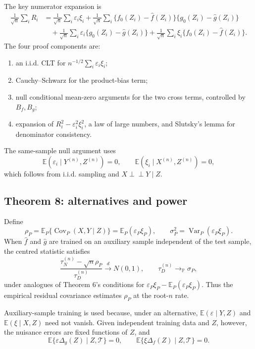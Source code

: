 \documentclass[11pt]{article}
\theoremstyle{definition}
\newcommand{\indep}{\perp\!\!\!\perp}
\newcommand{\E}{\mathbb{E}}
\newcommand{\Var}{\operatorname{Var}}
\newcommand{\Cov}{\operatorname{Cov}}
\newcommand{\calT}{\mathcal{T}}
\begin{document}
The key numerator expansion is
\begin{align}
\frac1{\sqrt n}\sum_iR_i
&=
\frac1{\sqrt n}\sum_i\varepsilon_i\xi_i
+
\frac1{\sqrt n}\sum_i\{f_0(Z_i)-\widehat f(Z_i)\}
\{g_0(Z_i)-\widehat g(Z_i)\} \nonumber\\
&\quad+
\frac1{\sqrt n}\sum_i\varepsilon_i\{g_0(Z_i)-\widehat g(Z_i)\}
+
\frac1{\sqrt n}\sum_i\xi_i\{f_0(Z_i)-\widehat f(Z_i)\}.
\label{eq:original-gcm-decomp}
\end{align}
The four proof components are:
\begin{enumerate}[leftmargin=*]
\item an i.i.d. CLT for $n^{-1/2}\sum_i\varepsilon_i\xi_i$;
\item Cauchy--Schwarz for the product-bias term;
\item null conditional mean-zero arguments for the two cross terms, controlled by $B_f,B_g$;
\item expansion of $R_i^2-\varepsilon_i^2\xi_i^2$, a law of large numbers, and Slutsky's
lemma for denominator consistency.
\end{enumerate}

The same-sample null argument uses
\[
\E(\varepsilon_i\mid Y^{(n)},Z^{(n)})=0,
\qquad
\E(\xi_i\mid X^{(n)},Z^{(n)})=0,
\]
which follows from i.i.d. sampling and $X\indep Y\mid Z$.

\subsection{Theorem 8: alternatives and power}

Define
\[
\rho_P=\E_P\{\Cov_P(X,Y\mid Z)\}=\E_P(\varepsilon_P\xi_P),
\qquad
\sigma_P^2=\Var_P(\varepsilon_P\xi_P).
\]
When $\widehat f$ and $\widehat g$ are trained on an auxiliary sample independent of the test
sample, the centred statistic satisfies
\[
\frac{\tau_N^{(n)}-\sqrt n\rho_P}{\tau_D^{(n)}}
\xrightarrow{d}N(0,1),
\qquad
\tau_D^{(n)}\to_{\mathbb P}\sigma_P,
\]
under analogues of Theorem 6's conditions for
$\varepsilon_P\xi_P-\E_P(\varepsilon_P\xi_P)$.
Thus the empirical residual covariance estimates $\rho_P$ at the root-$n$ rate.

Auxiliary-sample training is used because, under an alternative,
$\E(\varepsilon\mid Y,Z)$ and $\E(\xi\mid X,Z)$ need not vanish. Given independent training
data and $Z$, however, the nuisance errors are fixed functions of $Z$, and
\[
\E\{\varepsilon\Delta_g(Z)\mid Z,\calT\}=0,
\qquad
\E\{\xi\Delta_f(Z)\mid Z,\calT\}=0.
\]
\end{document}
